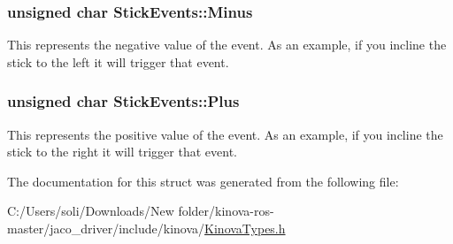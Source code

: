 \subsubsection[{\texorpdfstring{Minus}{Minus}}]{\setlength{\rightskip}{0pt plus 5cm}unsigned char Stick\+Events\+::\+Minus}\hypertarget{struct_stick_events_a73b68205dc2b526373df337d6a4ad532}{}\label{struct_stick_events_a73b68205dc2b526373df337d6a4ad532}


This represents the negative value of the event. As an example, if you incline the stick to the left it will trigger that event. 

\subsubsection[{\texorpdfstring{Plus}{Plus}}]{\setlength{\rightskip}{0pt plus 5cm}unsigned char Stick\+Events\+::\+Plus}\hypertarget{struct_stick_events_ae59f407e1c54c77b4d444fa9c27d5211}{}\label{struct_stick_events_ae59f407e1c54c77b4d444fa9c27d5211}


This represents the positive value of the event. As an example, if you incline the stick to the right it will trigger that event. 



The documentation for this struct was generated from the following file\+:\begin{DoxyCompactItemize}
\item 
C\+:/\+Users/soli/\+Downloads/\+New folder/kinova-\/ros-\/master/jaco\+\_\+driver/include/kinova/\hyperlink{_kinova_types_8h}{Kinova\+Types.\+h}\end{DoxyCompactItemize}
